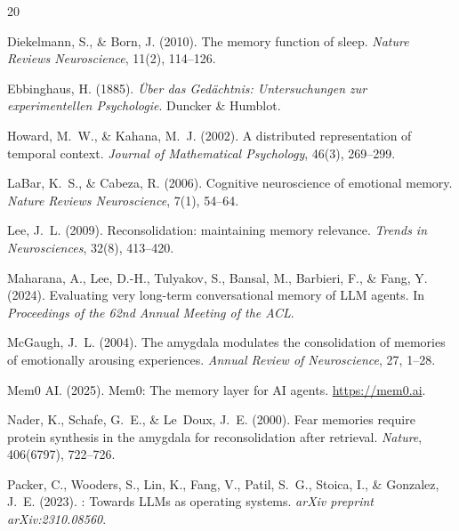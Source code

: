 \documentclass{article}
\begin{document}
\begin{thebibliography}{20}

Diekelmann, S., \& Born, J. (2010).
\newblock The memory function of sleep.
\newblock \emph{Nature Reviews Neuroscience}, 11(2), 114--126.

Ebbinghaus, H. (1885).
\newblock \emph{{\"U}ber das Ged{\"a}chtnis: Untersuchungen zur experimentellen Psychologie}.
\newblock Duncker \& Humblot.

Howard, M.~W., \& Kahana, M.~J. (2002).
\newblock A distributed representation of temporal context.
\newblock \emph{Journal of Mathematical Psychology}, 46(3), 269--299.

LaBar, K.~S., \& Cabeza, R. (2006).
\newblock Cognitive neuroscience of emotional memory.
\newblock \emph{Nature Reviews Neuroscience}, 7(1), 54--64.

Lee, J.~L. (2009).
\newblock Reconsolidation: maintaining memory relevance.
\newblock \emph{Trends in Neurosciences}, 32(8), 413--420.

Maharana, A., Lee, D.-H., Tulyakov, S., Bansal, M., Barbieri, F., \& Fang, Y. (2024).
\newblock Evaluating very long-term conversational memory of {LLM} agents.
\newblock In \emph{Proceedings of the 62nd Annual Meeting of the ACL}.

McGaugh, J.~L. (2004).
\newblock The amygdala modulates the consolidation of memories of emotionally arousing experiences.
\newblock \emph{Annual Review of Neuroscience}, 27, 1--28.

Mem0 AI. (2025).
\newblock Mem0: The memory layer for {AI} agents.
\newblock \url{https://mem0.ai}.

Nader, K., Schafe, G.~E., \& Le~Doux, J.~E. (2000).
\newblock Fear memories require protein synthesis in the amygdala for reconsolidation after retrieval.
\newblock \emph{Nature}, 406(6797), 722--726.

Packer, C., Wooders, S., Lin, K., Fang, V., Patil, S.~G., Stoica, I., \& Gonzalez, J.~E. (2023).
: Towards {LLMs} as operating systems.
\newblock \emph{arXiv preprint arXiv:2310.08560}.


\end{thebibliography}
\end{document}
